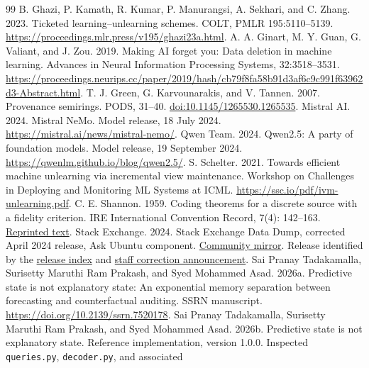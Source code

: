 \begin{thebibliography}{99}
 B. Ghazi, P. Kamath, R. Kumar, P. Manurangsi,
A. Sekhari, and C. Zhang. 2023. Ticketed learning--unlearning schemes.
COLT, PMLR 195:5110--5139.
\url{https://proceedings.mlr.press/v195/ghazi23a.html}.
 A. A. Ginart, M. Y. Guan,
G. Valiant, and J. Zou. 2019. Making AI forget you: Data deletion in
machine learning. Advances in Neural Information Processing Systems,
32:3518--3531.
\url{https://proceedings.neurips.cc/paper/2019/hash/cb79f8fa58b91d3af6c9c991f63962d3-Abstract.html}.
 T. J. Green, G. Karvounarakis, and V. Tannen. 2007.
Provenance semirings. PODS, 31--40.
\href{https://doi.org/10.1145/1265530.1265535}{doi:10.1145/1265530.1265535}.
 Mistral AI. 2024. Mistral NeMo.
Model release, 18 July 2024. \url{https://mistral.ai/news/mistral-nemo/}.
 Qwen Team. 2024. Qwen2.5: A party of foundation models.
Model release, 19 September 2024. \url{https://qwenlm.github.io/blog/qwen2.5/}.
 S. Schelter. 2021. Towards efficient machine
unlearning via incremental view maintenance. Workshop on Challenges in
Deploying and Monitoring ML Systems at ICML.
\url{https://ssc.io/pdf/ivm-unlearning.pdf}.
 C. E. Shannon. 1959. Coding theorems for a discrete
source with a fidelity criterion. IRE International Convention Record, 7(4):
142--163. \href{https://gwern.net/doc/cs/algorithm/information/1959-shannon.pdf}{Reprinted text}.
 Stack Exchange. 2024.
Stack Exchange Data Dump, corrected April 2024 release, Ask Ubuntu component.
\href{https://archive.org/details/stackexchange_20240402_bis}{Community mirror}.
Release identified by the \href{https://meta.stackexchange.com/questions/224873/all-stack-exchange-data-dump-releases}{release index}
and \href{https://meta.stackexchange.com/a/398606}{staff correction announcement}.
 Sai Pranay Tadakamalla,
Surisetty Maruthi Ram Prakash, and Syed Mohammed Asad. 2026a.
Predictive state is not explanatory state: An exponential memory separation
between forecasting and counterfactual auditing. SSRN manuscript.
\url{https://doi.org/10.2139/ssrn.7520178}.
 Sai Pranay Tadakamalla,
Surisetty Maruthi Ram Prakash, and Syed Mohammed Asad. 2026b.
Predictive state is not explanatory state. Reference implementation, version
1.0.0. Inspected \texttt{queries.py}, \texttt{decoder.py}, and associated

\end{thebibliography}
